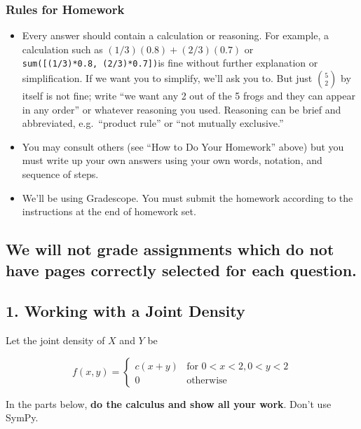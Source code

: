 \documentclass[11pt]{article}
\providecommand{\tightlist}{%
      \setlength{\itemsep}{0pt}\setlength{\parskip}{0pt}}
\begin{document}
    \subsubsection{Rules for Homework}\label{rules-for-homework}

\begin{itemize}
\tightlist
\item
  Every answer should contain a calculation or reasoning. For example, a
  calculation such as \((1/3)(0.8) + (2/3)(0.7)\) or
  \texttt{sum({[}(1/3)*0.8,\ (2/3)*0.7{]})}is fine without further
  explanation or simplification. If we want you to simplify, we'll ask
  you to. But just \({5 \choose 2}\) by itself is not fine; write ``we
  want any 2 out of the 5 frogs and they can appear in any order'' or
  whatever reasoning you used. Reasoning can be brief and abbreviated,
  e.g.~``product rule'' or ``not mutually exclusive.''
\item
  You may consult others (see ``How to Do Your Homework'' above) but you
  must write up your own answers using your own words, notation, and
  sequence of steps.
\item
  We'll be using Gradescope. You must submit the homework according to
  the instructions at the end of homework set.
\end{itemize}

\subsection{\texorpdfstring{\textbf{We will not grade assignments which
do not have pages correctly selected for each
question.}}{We will not grade assignments which do not have pages correctly selected for each question.}}\label{we-will-not-grade-assignments-which-do-not-have-pages-correctly-selected-for-each-question.}

    \newpage

    \subsection{1. Working with a Joint
Density}\label{working-with-a-joint-density}

Let the joint density of \(X\) and \(Y\) be

\[
f(x, y) = 
\begin{cases}
c(x+y) & \text{for } 0 < x < 2, 0 < y < 2 \\
0 & \text{otherwise}
\end{cases}
\]

In the parts below, \textbf{do the calculus and show all your work}.
Don't use SymPy.
\end{document}
